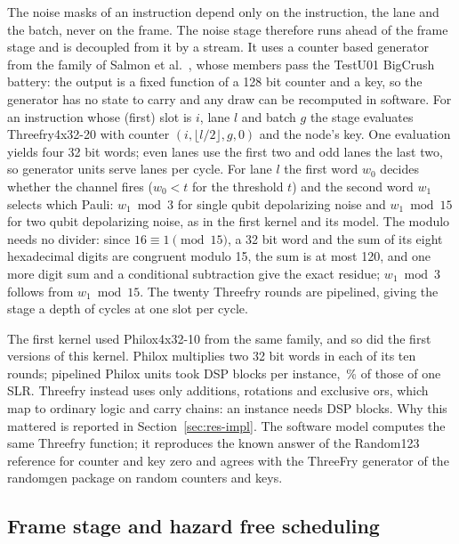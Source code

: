 The noise masks of an instruction depend only on the instruction, the lane and the batch, never on the frame. The noise
stage therefore runs ahead of the frame stage and is decoupled from it by a stream. It uses a counter based generator
from the family of Salmon et al.~\cite{salmon2011random123}, whose members pass the TestU01 BigCrush battery: the output
is a fixed function of a 128 bit counter and a key, so the generator has no state to carry and any draw can be
recomputed in software. For an instruction whose (first) slot is $i$, lane $l$ and batch $g$ the stage evaluates
Threefry4x32-20 with counter $(i, \lfloor l/2\rfloor, g, 0)$ and the node's key. One evaluation yields four 32 bit
words; even lanes use the first two and odd lanes the last two, so \NumPairs{} generator units serve \NumLanes{} lanes
per cycle. For lane $l$ the first word $w_0$ decides whether the channel fires ($w_0 < t$ for the threshold $t$) and
the second word $w_1$ selects which Pauli: $w_1 \bmod 3$ for single qubit depolarizing noise and $w_1 \bmod 15$ for two
qubit depolarizing noise, as in the first kernel and its model. The modulo needs no divider: since $16 \equiv 1
\pmod{15}$, a 32 bit word and the sum of its eight hexadecimal digits are congruent modulo 15, the sum is at most 120,
and one more digit sum and a conditional subtraction give the exact residue; $w_1 \bmod 3$ follows from $w_1 \bmod
15$. The twenty Threefry rounds are pipelined, giving the stage a depth of \NumDepthNoise{} cycles at one slot per
cycle.

The first kernel used Philox4x32-10 from the same family, and so did the first versions of this
kernel. Philox multiplies two 32 bit words in each of its ten rounds; \NumPairs{} pipelined Philox units took
\NumPhiloxDsp{} DSP blocks per instance, \NumPhiloxDspSlr\,\% of those of one SLR. Threefry instead uses only
additions, rotations and exclusive ors, which map to ordinary logic and carry chains: an instance needs
\NumHlsDsp{} DSP blocks. Why this mattered is reported in Section~\ref{sec:res-impl}. The software model computes the
same Threefry function; it reproduces the known answer of the Random123 reference for counter and key zero and agrees
with the ThreeFry generator of the randomgen package on random counters and keys.

\subsection{Frame stage and hazard free scheduling}\label{sec:frame}

